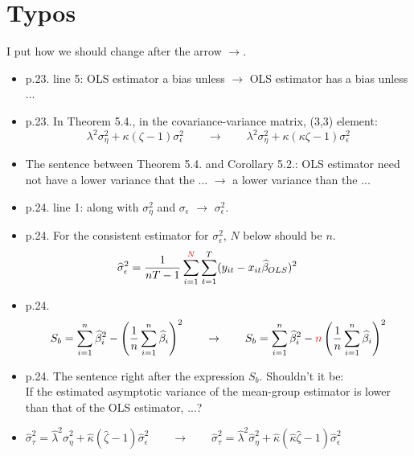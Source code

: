 \documentclass[11pt]{article}
\begin{document}



\doublespacing



\section*{Typos}

I put how we should change after the arrow $\rightarrow$. 

\begin{itemize}
\item p.23. line 5: OLS estimator a bias unless $\rightarrow$ OLS estimator has a bias unless ...
\item p.23. In Theorem 5.4., in the covariance-variance matrix, (3,3) element:
\[
\lambda^2 \sigma_\eta^2 + \kappa(\zeta-1)\sigma_\epsilon^2 \quad \quad \rightarrow \quad \quad \lambda^2 \sigma_\eta^2 + \kappa(\kappa\zeta - 1) \sigma_\epsilon^2
\] 
\item The sentence between Theorem 5.4. and Corollary 5.2.: OLS estimator need not have a lower variance that the ... $\rightarrow$ a lower variance than the ...
\item p.24. line 1: along with $\sigma_\eta^2$ and $\sigma_\epsilon$ $\rightarrow$ $\sigma_\epsilon^2$.
\item p.24. For the consistent estimator for $\sigma_\epsilon^2$, $N$ below should be $n$.
\[
\widehat{\sigma}_\epsilon^2 = \frac{1}{nT-1} \sum_{i=1}^{\textcolor{red}{N}} \sum
_{t=1}^T (y_{it} - x_{it} \widehat{\beta}_{OLS})^2 \quad \quad
\]
\item p.24. 
\[
S_b = \sum_{i=1}^n \widehat{\beta}_i^2 - \left(\frac{1}{n}\sum_{i=1}^n \widehat{\beta}_i \right)^2 \quad \quad \rightarrow \quad \quad S_b = \sum_{i=1}^n \widehat{\beta}_i^2 - \textcolor{red}{n}\left(\frac{1}{n}\sum_{i=1}^n \widehat{\beta}_i \right)^2
\]
\item p.24. The sentence right after the expression $S_b$. Shouldn't it be:\\
If the estimated asymptotic variance of the mean-group estimator is lower than that of the OLS estimator, ...?
\item $\widehat{\sigma}_\tau^2 = \widehat{\lambda}^2 \widehat{\sigma}_\eta^2 + \widehat{\kappa} (\widehat{\zeta} - 1)\widehat{\sigma}_\epsilon^2  \quad \quad \rightarrow \quad \quad \widehat{\sigma}_\tau^2 = \widehat{\lambda}^2 \widehat{\sigma}_\eta^2 + \widehat{\kappa} (\widehat{\kappa}\widehat{\zeta} - 1)\widehat{\sigma}_\epsilon^2$  

\end{itemize}
\end{document}
